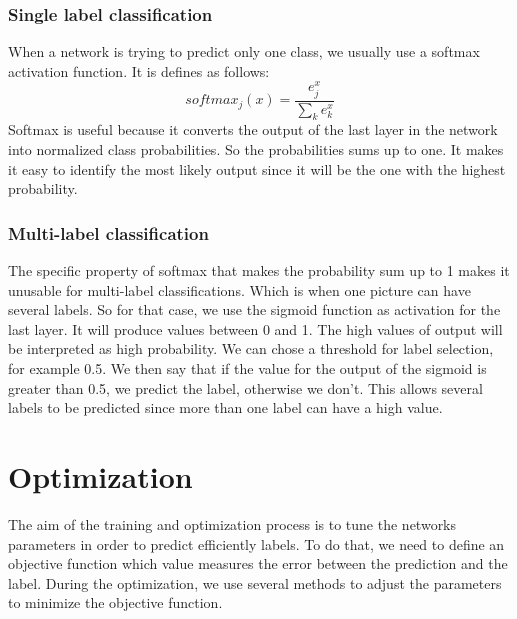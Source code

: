 \subsubsection{Single label classification}
When a network is trying to predict only one class, we usually use a softmax activation function. It is defines as follows: \[softmax_j(x) = \frac{e^x_j}{\sum\nolimits_{k} e^x_k} \]Softmax is useful because it converts the output of the last layer in the network into normalized class probabilities. So the probabilities sums up to one. It makes it easy to identify the most likely output since it will be the one with the highest probability. 
\subsubsection{Multi-label classification}
The specific property of softmax that makes the probability sum up to 1 makes it unusable for multi-label classifications. Which is when one picture can have several labels. So for that case, we use the sigmoid function as activation for the last layer. It will produce values between 0 and 1. The high values of output will be interpreted as high probability. We can chose a threshold for label selection, for example 0.5. We then say that if the value for the output of the sigmoid is greater than 0.5, we predict the label, otherwise we don't. This allows several labels to be predicted since more than one label can have a high value. 

\section{Optimization}
The aim of the training and optimization process is to tune the networks parameters in order to predict efficiently labels. To do that, we need to define an objective function which value measures the error between the prediction and the label. During the optimization, we use several methods to adjust the parameters to minimize the objective function.

